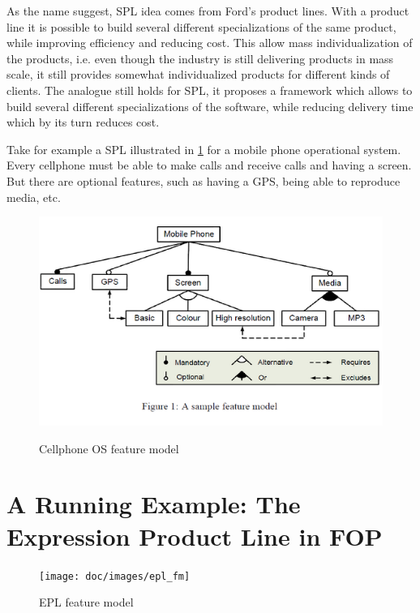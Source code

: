 As the name suggest, \gls{SPL} idea comes from Ford's product lines. With a product line
it is possible to build several different specializations of the same product, while
improving efficiency and reducing cost. This allow mass individualization of the products, i.e. even though the industry is still delivering products in mass scale,
it still provides somewhat individualized products for different kinds of clients.
The analogue still holds for \gls{SPL}, it proposes a framework which allows to build
several different specializations of the software, 
while reducing delivery time which by its turn reduces cost.

Take for example a \gls{SPL} illustrated in \ref{fig:cellphone-fm} for a mobile phone operational system. Every cellphone
must be able to make calls and receive calls and having a screen. 
But there are optional features, such as having a GPS, being able to reproduce media,
etc.

\begin{figure}
\centering
\includegraphics[scale=0.35]{doc/images/mobile-spl}
\label{fig:cellphone-fm}
\caption{Cellphone OS feature model} 
\end{figure} 

\section{A Running Example: The Expression Product Line in \gls{FOP}}

\begin{figure}
\centering
\texttt{[image: doc/images/epl\_fm]}
\label{fig:epl_fm}
\caption{EPL feature model} 
\end{figure} 


